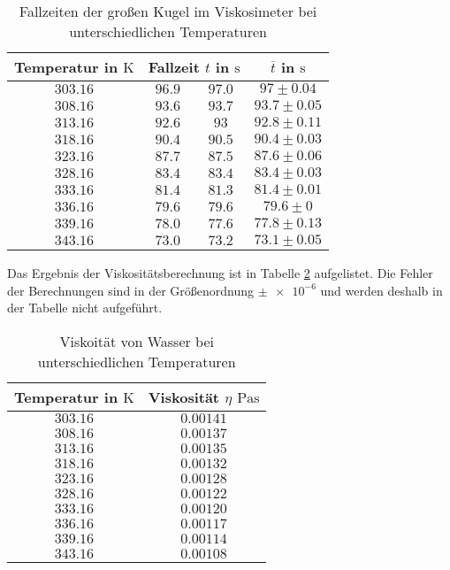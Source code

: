 \begin{table}
\centering
\begin{tabular} {cccc}
  \toprule
  Temperatur in $\si{\kelvin}$ & \multicolumn{2}{c}{Fallzeit $t$ in $\si{\second}$} & $\overline{t}$ in $\si{\second}$ \\
  \midrule 
  $\num{303.16}$ & $\num{96.9}$  & $\num{97.0}$ & $\num{97}\pm\num{0.04}$ \\
  $\num{308.16}$ & $\num{93.6}$  & $\num{93.7}$ & $\num{93.7}\pm\num{0.05}$ \\
  $\num{313.16}$ & $\num{92.6}$ & $\num{93}$   & $\num{92.8}\pm\num{0.11}$ \\
  $\num{318.16}$ & $\num{90.4}$ & $\num{90.5}$ &  $\num{90.4}\pm\num{0.03}$ \\
  $\num{323.16}$ & $\num{87.7}$ & $\num{87.5}$ & $\num{87.6}\pm\num{0.06}$ \\
  $\num{328.16}$ & $\num{83.4}$ & $\num{83.4}$ & $\num{83.4}\pm\num{0.03}$ \\
  $\num{333.16}$ & $\num{81.4}$ & $\num{81.3}$ & $\num{81.4}\pm\num{0.01}$ \\
  $\num{336.16}$ & $\num{79.6}$ & $\num{79.6}$ & $\num{79.6}\pm\num{0}$ \\
  $\num{339.16}$ & $\num{78.0}$ &  $\num{77.6}$ & $\num{77.8}\pm\num{0.13}$ \\
  $\num{343.16}$ & $\num{73.0}$ & $\num{73.2}$ & $\num{73.1}\pm\num{0.05}$ \\
\bottomrule
\end{tabular}
\caption{Fallzeiten der großen Kugel im Viskosimeter bei unterschiedlichen Temperaturen}
\label{tab:messwerte_fallzeit_kugel_gross_temo}
\end{table}

Das Ergebnis der Viskositätsberechnung ist in Tabelle \ref{tab:visko_wasser_temp} aufgelistet.
Die Fehler der Berechnungen sind in der Größenordnung $\pm \num{e-6}$ und 
werden deshalb in der Tabelle nicht aufgeführt.

\begin{table}
\centering
\begin{tabular} {cc}
  \toprule
  Temperatur in $\si{\kelvin}$ & Viskosität $\eta$ $\si{\pascal\second}$ \\
  \midrule 
  $\num{303.16}$ & $\num{0.00141}$ \\
  $\num{308.16}$ & $\num{0.00137}$ \\
  $\num{313.16}$ & $\num{0.00135}$ \\ 
  $\num{318.16}$ & $\num{0.00132}$ \\
  $\num{323.16}$ & $\num{0.00128}$ \\ 
  $\num{328.16}$ & $\num{0.00122}$ \\ 
  $\num{333.16}$ & $\num{0.00120}$ \\ 
  $\num{336.16}$ & $\num{0.00117}$ \\
  $\num{339.16}$ & $\num{0.00114}$ \\
  $\num{343.16}$ & $\num{0.00108}$ \\
\bottomrule
\end{tabular}
\caption{Viskoität von Wasser bei unterschiedlichen Temperaturen}
\label{tab:visko_wasser_temp}
\end{table}


